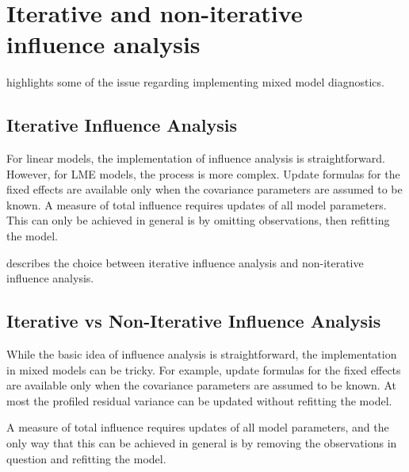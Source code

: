 \documentclass[12pt, a4paper]{report}
\begin{document}
		\newpage
		\section{Iterative and non-iterative influence analysis} %
		\citet{schab} highlights some of the issue regarding implementing mixed model diagnostics.
		
		
		\subsection{Iterative Influence Analysis}
		
		For linear models, the implementation of influence analysis is straightforward.
		However, for LME models, the process is more complex. Update formulas for the fixed effects are available only when the covariance parameters are assumed to be known. A measure of total influence requires updates of all model parameters.
		This can only be achieved in general is by omitting observations, then refitting the model.
		
		\citet{schab} describes the choice between  iterative influence analysis and  non-iterative influence analysis.
		
		
		
		
		
		\subsection{Iterative vs Non-Iterative Influence Analysis}
		While the basic idea of influence analysis is straightforward, the implementation in mixed models can be
		tricky. For example, update formulas for the fixed effects are available only when the covariance parameters
		are assumed to be known. At most the profiled residual variance can be updated without refitting the model.
		
		A measure of total influence requires updates of all model parameters, and the only way that this can be
		achieved in general is by removing the observations in question and refitting the model. 
		
\end{document}
